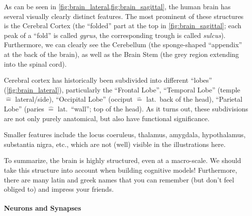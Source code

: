 \documentclass[10pt,letterpaper,oneside]{article}
\begin{document}
As can be seen in \cref{fig:brain_lateral,fig:brain_sagittal}, the human brain has several visually clearly distinct features. The most prominent of these structures is the Cerebral Cortex (the \enquote{folded} part at the top in \cref{fig:brain_sagittal}; each peak of a \enquote{fold} is called \emph{gyrus}, the corresponding trough is called \emph{sulcus}). Furthermore, we can clearly see the Cerebellum (the sponge-shaped \enquote{appendix} at the back of the brain), as well as the Brain Stem (the grey region extending into the spinal cord).

Cerebral cortex has historically been subdivided into different \enquote{lobes} (\cref{fig:brain_lateral}), particularly the \enquote{Frontal Lobe}, \enquote{Temporal Lobe} (temple $\hat=$ lateral/side), \enquote{Occipital Lobe} (occiput $\hat=$ lat.~back of the head), \enquote{Parietal Lobe} (paries $\hat=$ lat.~\enquote{wall}; top of the head). As it turns out, these subdivisions are not only purely anatomical, but also have functional significance.

Smaller features include the locus coeruleus, thalamus, amygdala, hypothalamus, substantia nigra, etc., which are not (well) visible in the illustrations here.

To summarize, the brain is highly structured, even at a macro-scale. We should take this structure into account when building cognitive models! Furthermore, there are many latin and greek names that you can remember (but don't feel obliged to) and impress your friends.


\paragraph{Neurons and Synapses}
\end{document}
